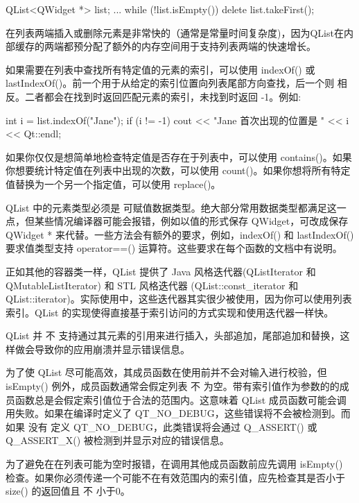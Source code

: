 \begin{cppcode}
QList<QWidget *> list;
...
while (!list.isEmpty())
    delete list.takeFirst();
\end{cppcode}

在列表两端插入或删除元素是非常快的（通常是常量时间复杂度)，因为QList在内部缓存的两端都预分配了额外的内存空间用于支持列表两端的快速增长。

如果需要在列表中查找所有特定值的元素的索引，可以使用 indexOf() 或
lastIndexOf()。前一个用于从给定的索引位置向列表尾部方向查找，后一个则
相反。二者都会在找到时返回匹配元素的索引，未找到时返回 -1。例如:


\begin{cppcode}
int i = list.indexOf("Jane");
if (i != -1)
    cout << "Jane 首次出现的位置是 " << i << Qt::endl;
\end{cppcode}

如果你仅仅是想简单地检查特定值是否存在于列表中，可以使用 contains()。如果你想要统计特定值在列表中出现的次数，可以使用 count()。如果你想将所有特定值替换为一个另一个指定值，可以使用 replace()。

QList 中的元素类型必须是 可赋值数据类型。绝大部分常用数据类型都满足这一点，但某些情况编译器可能会报错，例如以值的形式保存 QWidget，可改成保存 QWidget * 来代替。一些方法会有额外的要求，例如，indexOf() 和 lastIndexOf() 要求值类型支持 operator==() 运算符。这些要求在每个函数的文档中有说明。

正如其他的容器类一样，QList 提供了 Java 风格迭代器(QListIterator 和 QMutableListIterator) 和 STL 风格迭代器 (QList::const\_iterator 和 QList::iterator)。实际使用中，这些迭代器其实很少被使用，因为你可以使用列表索引。QList 的实现使得直接基于索引访问的方式实现和使用迭代器一样快。

QList 并 不 支持通过其元素的引用来进行插入，头部追加，尾部追加和替换，这样做会导致你的应用崩溃并显示错误信息。

为了使 QList 尽可能高效，其成员函数在使用前并不会对输入进行校验，但 isEmpty() 例外，成员函数通常会假定列表 不 为空。带有索引值作为参数的的成员函数总是会假定索引值位于合法的范围内。这意味着 QList 成员函数可能会调用失败。如果在编译时定义了 QT\_NO\_DEBUG，这些错误将不会被检测到。而如果 没有 定义 QT\_NO\_DEBUG，此类错误将会通过 Q\_ASSERT() 或 Q\_ASSERT\_X() 被检测到并显示对应的错误信息。

为了避免在在列表可能为空时报错，在调用其他成员函数前应先调用 isEmpty()
检查。如果你必须传递一个可能不在有效范围内的索引值，应先检查其是否小于
size() 的返回值且 不 小于0。


